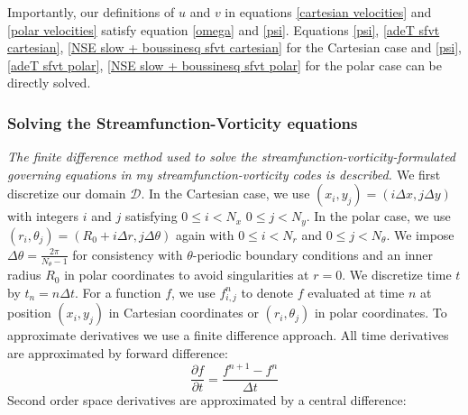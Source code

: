 \documentclass{article}
\begin{document}
Importantly, our definitions of $u$ and $v$ in equations \ref{cartesian velocities} and \ref{polar velocities} satisfy equation \ref{omega} and \ref{psi}. Equations \ref{psi}, \ref{adeT sfvt cartesian}, \ref{NSE slow + boussinesq sfvt cartesian} for the Cartesian case and \ref{psi}, \ref{adeT sfvt polar}, \ref{NSE slow + boussinesq sfvt polar} for the polar case can be directly solved.

\subsubsection*{Solving the Streamfunction-Vorticity equations}
{\it{The finite difference method used to solve the streamfunction-vorticity-formulated governing equations in my streamfunction-vorticity codes is described. }}
\vspace{0.3cm}
\newline
\noindent We first discretize our domain $\mathcal{D}$. In the Cartesian case, we use $(x_i,y_j)=(i \Delta x, j \Delta y)
$ with integers $i$ and $j$ satisfying $0\leq i < N_x$ $0 \leq j < N_y$. In the polar case, we use $(r_i, \theta_j)= (R_0 
+ i \Delta r, j 
\Delta \theta)$ again with  $0 \leq i < N_r$ and $0 \leq j < N_{\theta}$. We impose $\Delta \theta = \frac{2 \pi}
{N_{\theta} - 1}$ for consistency with $\theta$-periodic boundary conditions and an inner radius $R_0$ in polar 
coordinates to avoid 
singularities at $r=0$. We discretize time $t$ by $t_n = n \Delta t$. For a function $f$, we use 
$f^n_{i,j}$ to denote $f$ evaluated at time $n$ at position $(x_i,y_j)$ in Cartesian coordinates or $(r_i, \theta_j)$ in 
polar coordinates. 
\newline
To approximate derivatives we use a finite difference approach. All time derivatives are approximated by forward difference:
\begin{equation}
	\frac{\partial f}{\partial t} = \frac{f^{n+1} - f^{n}}{\Delta t}
	\label{forward time difference}
\end{equation}
Second order space derivatives are approximated by a central difference:
\end{document}
